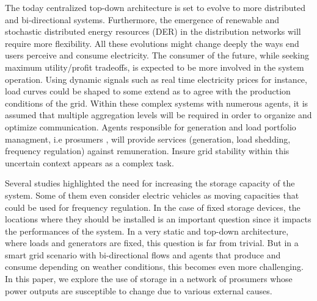 \documentclass[conference]{IEEEtran}
\begin{document}
The today centralized top-down architecture is set to evolve to more distributed and bi-directional systems. Furthermore, the emergence of renewable and stochastic distributed energy resources (DER) in the distribution networks will require more flexibility. All these evolutions might change deeply the ways end users perceive and consume electricity. The consumer of the future, while seeking maximum utility/profit tradeoffs, is expected to be more involved in the system operation. Using dynamic signals such as real time electricity prices for instance, load curves could be shaped to some extend as to agree with the production conditions of the grid. Within these complex systems with numerous agents, it is assumed that multiple aggregation levels will be required in order to organize and optimize communication. Agents responsible for generation and load portfolio managment, i.e prosumers \cite{Rathnayaka2012}, will provide services (generation, load shedding, frequency regulation) against remuneration. Insure grid stability within this uncertain context appears as a complex task. 

Several studies highlighted the need for increasing the storage capacity of the system. Some of them even consider electric vehicles as moving capacities that could be used for frequency regulation. In the case of fixed storage devices, the locations where they should be installed is an important question since it impacts the performances of the system. In a very static and top-down architecture, where loads and generators are fixed, this question is far from trivial. But in a smart grid scenario with bi-directional flows and agents that produce and consume depending on weather conditions, this becomes even more challenging. In this paper, we explore the use of storage in a network of prosumers whose power outputs are susceptible to change due to various external causes. 



\end{document}

